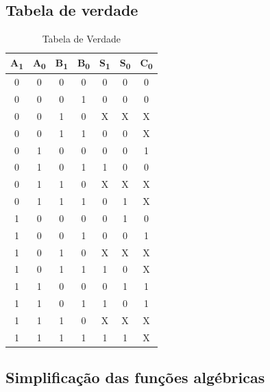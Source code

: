 \documentclass[a4paper,12pt]{article}
\begin{document}
\subsection{Tabela de verdade}
 
\begin{table}[h]

\centering
\begin{tabular}{ || c  c | c c || c c| c || }
\hline
A\textsubscript{1} & A\textsubscript{0} & B\textsubscript{1} & B\textsubscript{0} & S\textsubscript{1} & S\textsubscript{0} & C\textsubscript{0} \\ \hline
0   & 0  & 0  & 0  & 0  & 0  & 0  \\ \hline
0   & 0  & 0  & 1  & 0  & 0  & 0  \\ \hline
0   & 0  & 1  & 0  & X  & X  & X  \\ \hline
0   &  0  & 1   & 1   & 0   & 0   & X   \\ \hline
0   &  1  &  0  & 0   & 0   & 0   & 1   \\ \hline
0   &  1  &  0  & 1   & 1   & 0   & 0   \\ \hline
0   &  1  &  1  & 0   & X   & X   & X   \\ \hline
0   &  1  &  1  & 1   & 0   & 1   & X   \\ \hline
1   &  0  &  0  & 0   & 0   & 1   & 0   \\ \hline
1   &  0  &  0  & 1   & 0   & 0   & 1   \\ \hline
1   &  0  &  1  & 0   & X   & X   & X   \\ \hline
1   &  0  &  1  & 1   & 1   & 0   & X   \\ \hline
1   &  1  &  0  & 0   & 0   & 1   & 1   \\ \hline
1   &  1  &  0  & 1   & 1   & 0   & 1   \\ \hline
1   &  1  &  1  & 0   & X   & X   & X   \\ \hline
1   &  1  &  1  & 1   & 1   & 1   & X   \\ \hline
\end{tabular}
\caption{Tabela de Verdade} %
\end{table}

\subsection{Simplificação das funções algébricas}
\end{document}
